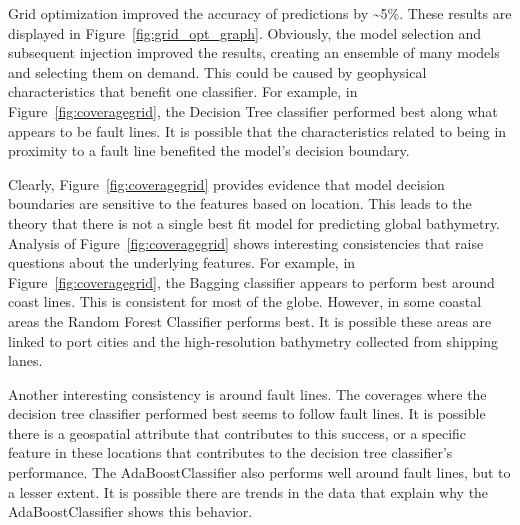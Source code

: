 \par
Grid optimization improved the accuracy of predictions by \~{}5\%.
These results are displayed in Figure~\ref{fig:grid_opt_graph}.
Obviously, the model selection and subsequent injection improved the results, creating an ensemble of many models and selecting them on demand.
This could be caused by geophysical characteristics that benefit one classifier.
For example, in Figure~\ref{fig:coveragegrid}, the Decision Tree classifier performed best along what appears to be fault lines.
It is possible that the characteristics related to being in proximity to a fault line benefited the model's decision boundary. 

\par
Clearly, Figure~\ref{fig:coveragegrid} provides evidence that model decision boundaries are sensitive to the features based on location.
This leads to the theory that there is not a single best fit model for predicting global bathymetry.
Analysis of Figure~\ref{fig:coveragegrid} shows interesting consistencies that raise questions about the underlying features.
For example, in Figure~\ref{fig:coveragegrid}, the Bagging classifier appears to perform best around coast lines.
This is consistent for most of the globe.
However, in some coastal areas the Random Forest Classifier performs best. 
It is possible these areas are linked to port cities and the high-resolution bathymetry collected from shipping lanes.

\par
Another interesting consistency is around fault lines.
The coverages where the decision tree classifier performed best seems to follow fault lines.
It is possible there is a geospatial attribute that contributes to this success, or a specific feature in these locations that contributes to the decision tree classifier's performance.
The AdaBoostClassifier also performs well around fault lines, but to a lesser extent.
It is possible there are trends in the data that explain why the AdaBoostClassifier shows this behavior.

